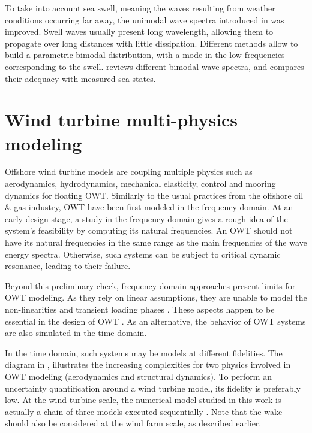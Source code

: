 To take into account sea swell, meaning the waves resulting from weather conditions occurring far away, the unimodal wave spectra introduced in  was improved. 
Swell waves usually present long wavelength, allowing them to propagate over long distances with little dissipation. 
Different methods allow to build a parametric bimodal distribution, with a mode in the low frequencies corresponding to the swell. 
\citet{guedes_2005_bimodal_jonswap} reviews different bimodal wave spectra, and compares their adequacy with measured sea states. 



\section{Wind turbine multi-physics modeling} \label{sec:owt_modeling}

Offshore wind turbine models are coupling multiple physics such as aerodynamics, hydrodynamics, mechanical elasticity, control and mooring dynamics for floating OWT. 
Similarly to the usual practices from the offshore oil \& gas industry, OWT have been first modeled in the frequency domain. 
At an early design stage, a study in the frequency domain gives a rough idea of the system's feasibility by computing its natural frequencies. 
An OWT should not have its natural frequencies in the same range as the main frequencies of the wave energy spectra. 
Otherwise, such systems can be subject to critical dynamic resonance, leading to their failure.

Beyond this preliminary check, frequency-domain approaches present limits for OWT modeling. 
As they rely on linear assumptions, they are unable to model the non-linearities and transient loading phases \citep{matha_2011_ISOPE}. 
These aspects happen to be essential in the design of OWT \citep{jonkman_2011_ISOPE}. 
As an alternative, the behavior of OWT systems are also simulated in the time domain. 

In the time domain, such systems may be models at different fidelities. 
The diagram in , illustrates the increasing complexities for two physics involved in OWT modeling (aerodynamics and structural dynamics). 
To perform an uncertainty quantification around a wind turbine model, its fidelity is preferably low. 
At the wind turbine scale, the numerical model studied in this work is actually a chain of three models executed sequentially . 
Note that the wake should also be considered at the wind farm scale, as described earlier. 

